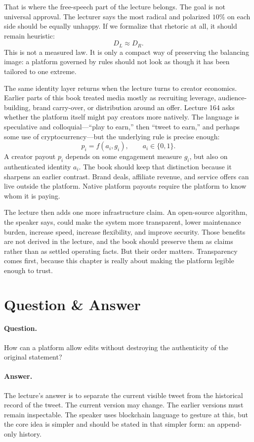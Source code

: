 \documentclass[11pt,oneside]{book}
\begin{document}
That is where the free-speech part of the lecture belongs. The goal is not universal approval. The lecturer says the most radical and polarized \(10\%\) on each side should be equally unhappy. If we formalize that rhetoric at all, it should remain heuristic:
\[
D_L \approx D_R.
\]
This is not a measured law. It is only a compact way of preserving the balancing image: a platform governed by rules should not look as though it has been tailored to one extreme.

The same identity layer returns when the lecture turns to creator economics. Earlier parts of this book treated media mostly as recruiting leverage, audience-building, brand carry-over, or distribution around an offer. Lecture 164 asks whether the platform itself might pay creators more natively. The language is speculative and colloquial---``play to earn,'' then ``tweet to earn,'' and perhaps some use of cryptocurrency---but the underlying rule is precise enough:
\[
p_i = f(a_i,g_i),
\qquad
a_i\in\{0,1\}.
\]
A creator payout \(p_i\) depends on some engagement measure \(g_i\), but also on authenticated identity \(a_i\). The book should keep that distinction because it sharpens an earlier contrast. Brand deals, affiliate revenue, and service offers can live outside the platform. Native platform payouts require the platform to know whom it is paying.

The lecture then adds one more infrastructure claim. An open-source algorithm, the speaker says, could make the system more transparent, lower maintenance burden, increase speed, increase flexibility, and improve security. Those benefits are not derived in the lecture, and the book should preserve them as claims rather than as settled operating facts. But their order matters. Transparency comes first, because this chapter is really about making the platform legible enough to trust.

\section{Question \& Answer}

\paragraph{Question.}
How can a platform allow edits without destroying the authenticity of the original statement?

\paragraph{Answer.}
The lecture's answer is to separate the current visible tweet from the historical record of the tweet. The current version may change. The earlier versions must remain inspectable. The speaker uses blockchain language to gesture at this, but the core idea is simpler and should be stated in that simpler form: an append-only history.
\end{document}
